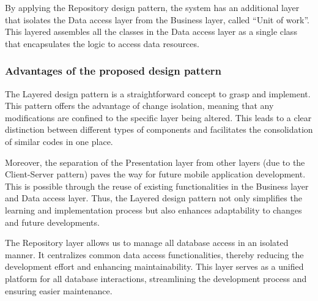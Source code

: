 By applying the Repository design pattern, the system has an additional layer that isolates the Data access layer from the Business layer, called “Unit of work”. This layered assembles all the classes in the Data access layer as a single class that encapsulates the logic to access data resources.

\subsubsection*{Advantages of the proposed design pattern}

The Layered design pattern is a straightforward concept to grasp and implement. This pattern offers the advantage of change isolation, meaning that any modifications are confined to the specific layer being altered. This leads to a clear distinction between different types of components and facilitates the consolidation of similar codes in one place. 

Moreover, the separation of the Presentation layer from other layers (due to the Client-Server pattern) paves the way for future mobile application development. This is possible through the reuse of existing functionalities in the Business layer and Data access layer. Thus, the Layered design pattern not only simplifies the learning and implementation process but also enhances adaptability to changes and future developments.

The Repository layer allows us to manage all database access in an isolated manner. It centralizes common data access functionalities, thereby reducing the development effort and enhancing maintainability. This layer serves as a unified platform for all database interactions, streamlining the development process and ensuring easier maintenance.

